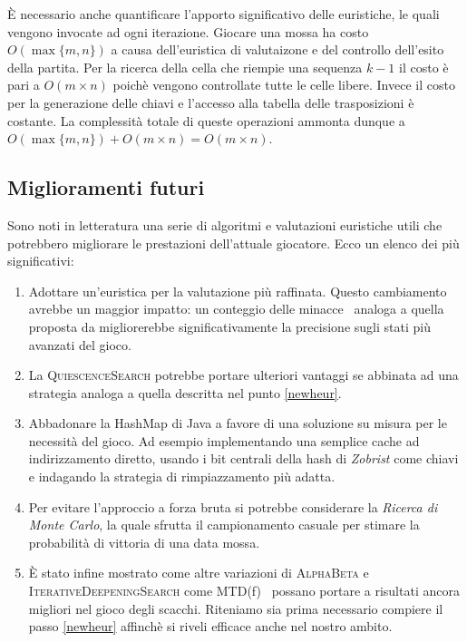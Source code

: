 \documentclass{article}
\begin{document}
\`E necessario anche quantificare l'apporto significativo delle euristiche,
le quali vengono invocate ad ogni iterazione. Giocare una mossa ha costo
$O(\max\{m, n\})$ a causa dell'euristica di valutaizone e del controllo
dell'esito della partita. Per la ricerca della cella che riempie una sequenza
$k-1$ il costo \`e pari a $O(m \times n)$ poich\`e vengono controllate tutte le celle libere.
Invece il costo per la generazione delle chiavi e l'accesso alla tabella delle
trasposizioni \`e costante. La complessit\`a totale di queste operazioni
ammonta dunque a $O(\max\{m,n\}) + O(m \times n) = O(m \times n)$.
\subsection{Miglioramenti futuri}

Sono noti in letteratura una serie di algoritmi e valutazioni euristiche utili
che potrebbero migliorare le prestazioni
dell'attuale giocatore. Ecco un elenco dei pi\`u significativi:
\begin{enumerate}
  \item Adottare un'euristica per la valutazione pi\`u raffinata. Questo cambiamento
    avrebbe un maggior impatto: un conteggio delle minacce~\cite{heur}
    analoga a quella proposta da \citeauthor{heur} migliorerebbe significativamente
    la precisione sugli stati pi\`u avanzati del gioco. \label{newheur}
  \item La \textsc{QuiescenceSearch} potrebbe portare ulteriori vantaggi se
    abbinata ad una strategia analoga a quella descritta nel punto \vref{newheur}.
  \item Abbadonare la HashMap di Java a favore di una soluzione su misura
    per le necessit\`a del gioco. Ad esempio implementando una semplice cache
    ad indirizzamento diretto, usando i bit centrali della hash di \emph{Zobrist}
    come chiavi e indagando la strategia di rimpiazzamento pi\`u adatta.
  \item Per evitare l'approccio a forza bruta si potrebbe considerare
    la \emph{Ricerca di Monte Carlo}, la quale sfrutta il campionamento casuale
    per stimare la probabilit\`a di vittoria di una data mossa.
  \item \`E stato infine mostrato come altre variazioni di \textsc{AlphaBeta} e
    \textsc{IterativeDeepeningSearch} come MTD(f)~\cite{mtdf} possano portare a
    risultati ancora migliori nel gioco degli scacchi. Riteniamo sia prima
    necessario compiere il passo \vref{newheur} affinch\`e si riveli efficace anche nel nostro ambito.
\end{enumerate}

\pagebreak


\end{document}
